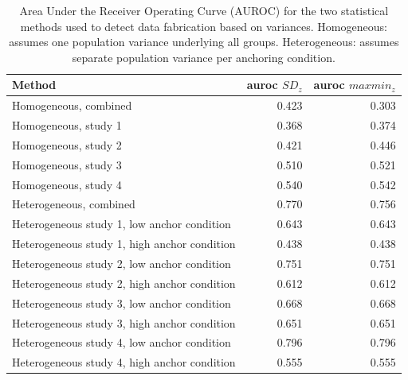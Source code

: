 \documentclass{article}
\begin{document}
\begin{table}[ht]
\centering
\begin{tabular}{lrr}
  \hline
Method & auroc $SD_z$ & auroc $maxmin_z$ \\ 
  \hline
Homogeneous, combined & 0.423 & 0.303 \\ 
  Homogeneous, study 1 & 0.368 & 0.374 \\ 
  Homogeneous, study 2 & 0.421 & 0.446 \\ 
  Homogeneous, study 3 & 0.510 & 0.521 \\ 
  Homogeneous, study 4 & 0.540 & 0.542 \\ 
  Heterogeneous, combined & 0.770 & 0.756 \\ 
  Heterogeneous study 1, low anchor condition & 0.643 & 0.643 \\ 
  Heterogeneous study 1, high anchor condition & 0.438 & 0.438 \\ 
  Heterogeneous study 2, low anchor condition & 0.751 & 0.751 \\ 
  Heterogeneous study 2, high anchor condition & 0.612 & 0.612 \\ 
  Heterogeneous study 3, low anchor condition & 0.668 & 0.668 \\ 
  Heterogeneous study 3, high anchor condition & 0.651 & 0.651 \\ 
  Heterogeneous study 4, low anchor condition & 0.796 & 0.796 \\ 
  Heterogeneous study 4, high anchor condition & 0.555 & 0.555 \\ 
   \hline
\end{tabular}
\caption{Area Under the Receiver Operating Curve (AUROC) for the two statistical methods used to detect data fabrication based on variances. Homogeneous: assumes one population variance underlying all groups. Heterogeneous: assumes separate population variance per anchoring condition.} 
\label{auroc_variances}
\end{table}
\end{document}
